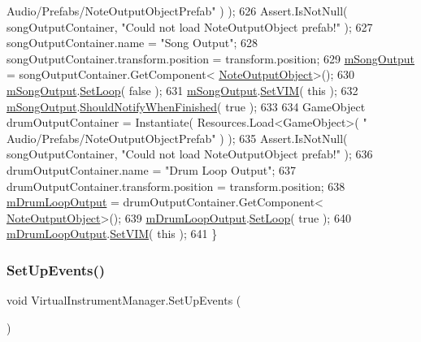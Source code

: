 \begin{DoxyCode}
{      Audio/Prefabs/NoteOutputObjectPrefab"} ) );
626         Assert.IsNotNull( songOutputContainer, \textcolor{stringliteral}{"Could not load NoteOutputObject prefab!"} );
627         songOutputContainer.name = \textcolor{stringliteral}{"Song Output"};
628         songOutputContainer.transform.position = transform.position;
629         \hyperlink{group___v_i_m_priv_gaa8d4f5642f5ac4dca4f4178b0052c78d}{mSongOutput} = songOutputContainer.GetComponent<
      \hyperlink{class_note_output_object}{NoteOutputObject}>();
630         \hyperlink{group___v_i_m_priv_gaa8d4f5642f5ac4dca4f4178b0052c78d}{mSongOutput}.\hyperlink{group___n_o_o_pub_func_ga7b79bbd2c7a68831b322edff140f29d2}{SetLoop}( \textcolor{keyword}{false} );
631         \hyperlink{group___v_i_m_priv_gaa8d4f5642f5ac4dca4f4178b0052c78d}{mSongOutput}.\hyperlink{group___n_o_o_pub_func_gaca261a6f8d95fc7f81bbc3c8108bad58}{SetVIM}( \textcolor{keyword}{this} );
632         \hyperlink{group___v_i_m_priv_gaa8d4f5642f5ac4dca4f4178b0052c78d}{mSongOutput}.\hyperlink{group___n_o_o_pub_func_gab7bad1b7d462676843be9e0bbfa1c9fb}{ShouldNotifyWhenFinished}( \textcolor{keyword}{true} );
633 
634         GameObject drumOutputContainer = Instantiate( Resources.Load<GameObject>( \textcolor{stringliteral}{"
      Audio/Prefabs/NoteOutputObjectPrefab"} ) );
635         Assert.IsNotNull( songOutputContainer, \textcolor{stringliteral}{"Could not load NoteOutputObject prefab!"} );
636         drumOutputContainer.name = \textcolor{stringliteral}{"Drum Loop Output"};
637         drumOutputContainer.transform.position = transform.position;
638         \hyperlink{group___v_i_m_priv_ga5f71cb71d240042312dcc13b481b068d}{mDrumLoopOutput} = drumOutputContainer.GetComponent<
      \hyperlink{class_note_output_object}{NoteOutputObject}>();
639         \hyperlink{group___v_i_m_priv_ga5f71cb71d240042312dcc13b481b068d}{mDrumLoopOutput}.\hyperlink{group___n_o_o_pub_func_ga7b79bbd2c7a68831b322edff140f29d2}{SetLoop}( \textcolor{keyword}{true} );
640         \hyperlink{group___v_i_m_priv_ga5f71cb71d240042312dcc13b481b068d}{mDrumLoopOutput}.\hyperlink{group___n_o_o_pub_func_gaca261a6f8d95fc7f81bbc3c8108bad58}{SetVIM}( \textcolor{keyword}{this} );
641     \}
\end{DoxyCode}
\mbox{\label{group___v_i_m_priv_func_gaa207d18111d38374017c580de4077589}} 
\subsubsection{\texorpdfstring{Set\+Up\+Events()}{SetUpEvents()}}
{\footnotesize\ttfamily void Virtual\+Instrument\+Manager.\+Set\+Up\+Events (\begin{DoxyParamCaption}{ }\end{DoxyParamCaption})\hspace{0.3cm}{\ttfamily [private]}}



